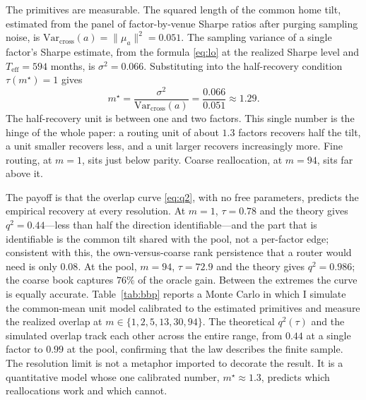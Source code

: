 \documentclass[12pt]{article}
\theoremstyle{plain}
\theoremstyle{definition}
\newcommand{\Var}{\mathrm{Var}}
\begin{document}
The primitives are measurable. The squared length of the common home tilt,
estimated from the panel of factor-by-venue Sharpe ratios after purging sampling
noise, is $\Var_{\text{cross}}(a)=\lVert\mu_a\rVert^2=0.051$. The sampling
variance of a single factor's Sharpe estimate, from the \citet{Lo2002} formula
\eqref{eq:lo} at the realized Sharpe level and $T_{\text{eff}}=594$ months, is
$\sigma^2=0.066$. Substituting into the half-recovery condition $\tau(m^\star)=1$
gives
\[
m^\star=\frac{\sigma^2}{\Var_{\text{cross}}(a)}
=\frac{0.066}{0.051}\approx 1.29.
\]
The half-recovery unit is between one and two factors. This single number is the
hinge of the whole paper: a routing unit of about $1.3$ factors recovers half the
tilt, a unit smaller recovers less, and a unit larger recovers increasingly more.
Fine routing, at $m=1$, sits just below parity. Coarse reallocation, at $m=94$,
sits far above it.

The payoff is that the overlap curve \eqref{eq:q2}, with no free parameters,
predicts the empirical recovery at every resolution. At $m=1$, $\tau=0.78$ and
the theory gives $q^2=0.44$---less than half the direction identifiable---and the
part that is identifiable is the common tilt shared with the pool, not a
per-factor edge; consistent with this, the own-versus-coarse rank persistence
that a router would need is only $0.08$. At the pool, $m=94$, $\tau=72.9$ and the
theory gives $q^2=0.986$; the coarse book captures $76\%$ of the oracle gain.
Between the extremes the curve is equally accurate. Table~\ref{tab:bbp} reports a
Monte Carlo in which I simulate the common-mean unit model calibrated to the
estimated primitives and measure the realized overlap at
$m\in\{1,2,5,13,30,94\}$. The theoretical $q^2(\tau)$ and the simulated overlap
track each other across the entire range, from $0.44$ at a single factor to
$0.99$ at the pool, confirming that the law describes the finite sample. The
resolution limit is not a metaphor imported to decorate the result. It is a
quantitative model whose one calibrated number, $m^\star\approx1.3$, predicts
which reallocations work and which cannot.
\end{document}
